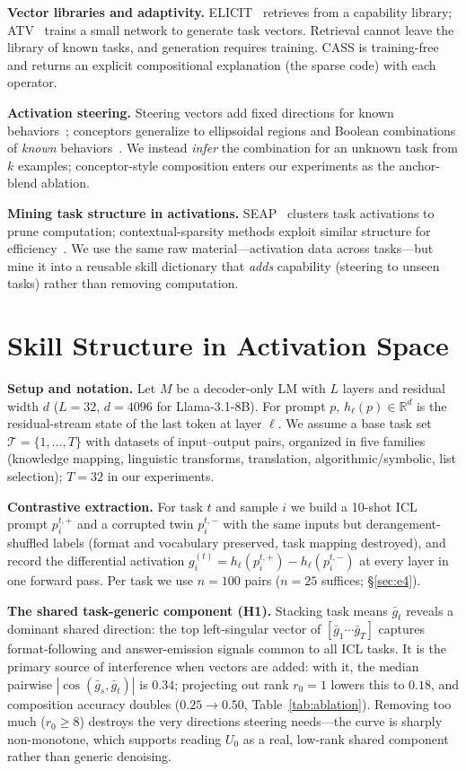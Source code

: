 \documentclass[sigconf,review,anonymous]{acmart}
\newcommand{\method}{\textsc{CASS}}
\newcommand{\R}{\mathbb{R}}
\begin{document}
\textbf{Vector libraries and adaptivity.} ELICIT~\cite{elicit2024} retrieves
from a capability library; ATV~\cite{atv2025} trains a small network to
generate task vectors. Retrieval cannot leave the library of known tasks, and
generation requires training. \method{} is training-free and returns an
explicit compositional explanation (the sparse code) with each operator.

\textbf{Activation steering.} Steering vectors add fixed directions for known
behaviors~\cite{turner2023actadd,zou2023repe}; conceptors generalize to
ellipsoidal regions and Boolean combinations of \emph{known}
behaviors~\cite{conceptor2024}. We instead \emph{infer} the combination for an
unknown task from $k$ examples; conceptor-style composition enters our
experiments as the anchor-blend ablation.

\textbf{Mining task structure in activations.} SEAP~\cite{seap2025} clusters
task activations to prune computation; contextual-sparsity methods exploit
similar structure for efficiency~\cite{dejavu2023}. We use the same raw
material---activation data across tasks---but mine it into a reusable skill
dictionary that \emph{adds} capability (steering to unseen tasks) rather than
removing computation.

\section{Skill Structure in Activation Space}
\label{sec:structure}
\textbf{Setup and notation.} Let $M$ be a decoder-only LM with $L$ layers and
residual width $d$ ($L{=}32$, $d{=}4096$ for Llama-3.1-8B). For prompt $p$,
$h_\ell(p)\in\R^d$ is the residual-stream state of the last token at layer
$\ell$. We assume a base task set $\mathcal T=\{1,\dots,T\}$ with datasets of
input--output pairs, organized in five families (knowledge mapping,
linguistic transforms, translation, algorithmic/symbolic, list selection);
$T{=}32$ in our experiments.

\textbf{Contrastive extraction.} For task $t$ and sample $i$ we build a
10-shot ICL prompt $p_i^{t,+}$ and a corrupted twin $p_i^{t,-}$ with the same
inputs but derangement-shuffled labels (format and vocabulary preserved, task
mapping destroyed), and record the differential activation
$g_i^{(t)}=h_\ell(p_i^{t,+})-h_\ell(p_i^{t,-})$ at every layer in one forward
pass. Per task we use $n{=}100$ pairs ($n{=}25$ suffices; \S\ref{sec:e4}).

\textbf{The shared task-generic component (H1).} Stacking task means
$\bar g_t$ reveals a dominant shared direction: the top left-singular vector
of $[\bar g_1 \cdots \bar g_T]$ captures format-following and
answer-emission signals common to all ICL tasks. It is the primary source of
interference when vectors are added: with it, the median pairwise
$|\cos(\bar g_s,\bar g_t)|$ is $0.34$; projecting out rank $r_0{=}1$ lowers
this to $0.18$, and composition accuracy doubles ($0.25\to0.50$,
Table~\ref{tab:ablation}). Removing too much ($r_0{\ge}8$) destroys the very
directions steering needs---the curve is sharply non-monotone, which supports
reading $U_0$ as a real, low-rank shared component rather than generic
denoising.
\end{document}
